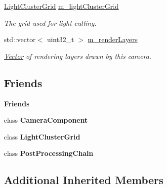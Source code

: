 \begin{Indent}
\begin{DoxyCompactItemize}
\mbox{\label{classrev_1_1_scene_camera_a0d65a676817f9ade4ecf0d2109a9a60b}} 
\mbox{\hyperlink{classrev_1_1_light_cluster_grid}{Light\+Cluster\+Grid}} \mbox{\hyperlink{classrev_1_1_scene_camera_a0d65a676817f9ade4ecf0d2109a9a60b}{m\+\_\+light\+Cluster\+Grid}}
\begin{DoxyCompactList}\small\item\em The grid used for light culling. \end{DoxyCompactList}\item 
\mbox{\label{classrev_1_1_scene_camera_a43506e9f385ebf03d40c8986eda7b550}} 
std\+::vector$<$ uint32\+\_\+t $>$ \mbox{\hyperlink{classrev_1_1_scene_camera_a43506e9f385ebf03d40c8986eda7b550}{m\+\_\+render\+Layers}}
\begin{DoxyCompactList}\small\item\em \mbox{\hyperlink{classrev_1_1_vector}{Vector}} of rendering layers drawn by this camera. \end{DoxyCompactList}\end{DoxyCompactItemize}
\end{Indent}
\subsection*{Friends}
\begin{Indent}\textbf{ Friends}\par
\begin{DoxyCompactItemize}
\item 
\mbox{\label{classrev_1_1_scene_camera_ae834a5e62eff7d0adb1092a0693388f7}} 
class {\bfseries Camera\+Component}
\item 
\mbox{\label{classrev_1_1_scene_camera_ad7e660ab0b686532a561ff61bc55fa11}} 
class {\bfseries Light\+Cluster\+Grid}
\item 
\mbox{\label{classrev_1_1_scene_camera_a1126a337e373c144dc36b23f4cac2d05}} 
class {\bfseries Post\+Processing\+Chain}
\end{DoxyCompactItemize}
\end{Indent}
\subsection*{Additional Inherited Members}


